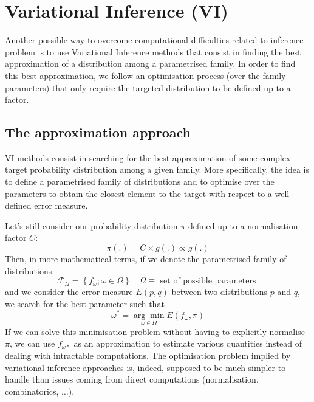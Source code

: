 \section{Variational Inference (VI)}

Another possible way to overcome computational difficulties related to inference problem is to use Variational Inference methods that consist in finding the best approximation of a distribution among a parametrised family. In order to find this best approximation, we follow an optimisation process (over the family parameters) that only require the targeted distribution to be defined up to a factor.

\subsection{The approximation approach}

VI methods consist in searching for the best approximation of some complex target probability distribution among a given family. More specifically, the idea is to define a parametrised family of distributions and to optimise over the parameters to obtain the closest element to the target with respect to a well defined error measure.

Let's still consider our probability distribution $\pi$ defined up to a normalisation factor $C$:
\begin{equation}\pi(.)=C \times g(.) \propto g(.)\end{equation}
Then, in more mathematical terms, if we denote the parametrised family of distributions
\begin{equation}\mathcal{F}_{\Omega}=\left\{f_{\omega} ; \omega \in \Omega\right\} \quad \Omega \equiv \text { set of possible parameters }\end{equation}
and we consider the error measure $E(p,q)$ between two distributions $p$ and $q$, we search for the best parameter such that
\begin{equation}\omega^{*}=\underset{\omega \in \Omega}{\arg \min } E\left(f_{\omega}, \pi\right)\end{equation}
If we can solve this minimisation problem without having to explicitly normalise $\pi$, we can use $f_{\omega*}$ as an approximation to estimate various quantities instead of dealing with intractable computations. The optimisation problem implied by variational inference approaches is, indeed, supposed to be much simpler to handle than issues coming from direct computations (normalisation, combinatorics, $\ldots$).

